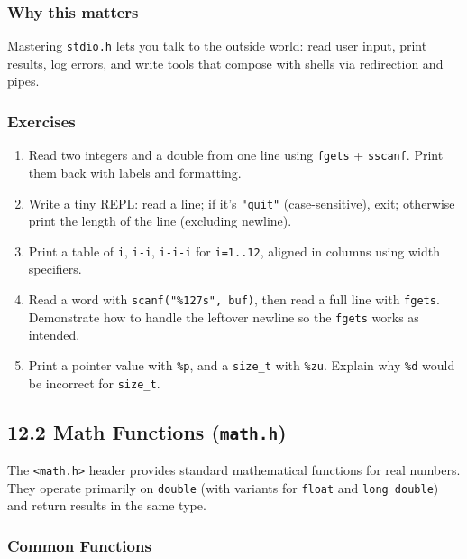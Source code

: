 \documentclass[
  letterpaper,
  DIV=11,
  numbers=noendperiod]{scrreprt}
\providecommand{\tightlist}{%
  \setlength{\itemsep}{0pt}\setlength{\parskip}{0pt}}
\begin{document}
\subsubsection{Why this matters}\label{why-this-matters-1}

Mastering \texttt{stdio.h} lets you talk to the outside world: read user
input, print results, log errors, and write tools that compose with
shells via redirection and pipes.

\subsubsection{Exercises}\label{exercises-55}

\begin{enumerate}
\def\labelenumi{\arabic{enumi}.}
\tightlist
\item
  Read two integers and a double from one line using \texttt{fgets} +
  \texttt{sscanf}. Print them back with labels and formatting.
\item
  Write a tiny REPL: read a line; if it's \texttt{"quit"}
  (case-sensitive), exit; otherwise print the length of the line
  (excluding newline).
\item
  Print a table of \texttt{i}, \texttt{i-i}, \texttt{i-i-i} for
  \texttt{i=1..12}, aligned in columns using width specifiers.
\item
  Read a word with \texttt{scanf("\%127s",\ buf)}, then read a full line
  with \texttt{fgets}. Demonstrate how to handle the leftover newline so
  the \texttt{fgets} works as intended.
\item
  Print a pointer value with \texttt{\%p}, and a \texttt{size\_t} with
  \texttt{\%zu}. Explain why \texttt{\%d} would be incorrect for
  \texttt{size\_t}.
\end{enumerate}

\subsection{\texorpdfstring{12.2 Math Functions
(\texttt{math.h})}{12.2 Math Functions (math.h)}}\label{math-functions-math.h}

The \texttt{\textless{}math.h\textgreater{}} header provides standard
mathematical functions for real numbers. They operate primarily on
\texttt{double} (with variants for \texttt{float} and
\texttt{long\ double}) and return results in the same type.

\subsubsection{Common Functions}\label{common-functions}
\end{document}
